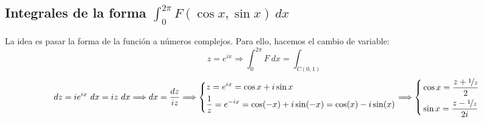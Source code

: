 \documentclass{report}
\begin{document}
      \subsection{Integrales de la  forma $\displaystyle \int_0^{2\pi}F(\cos x,\sin x)\ dx$}
        \noindent La idea es pasar la forma de la función a números complejos. Para ello, hacemos el cambio de variable:
        \[z=e^{ix}\Longrightarrow \int_0^{2\pi}F\ dx=\int_{C(0,1)}\]
        \[dz=ie^{ix}\ dx=iz\ dx\Longrightarrow dx=\dfrac{dz}{iz}\Longrightarrow
        \left\{\begin{aligned}
          &z=e^{ix}=\cos x+i\sin x\\
          &\dfrac{1}{z}=e^{-ix}=\cos (-x)+i\sin (-x)=\cos (x)-i\sin (x)
        \end{aligned}\right.\Longrightarrow 
        \left\{\begin{aligned}
          &\cos x=\dfrac{z+\nicefrac{1}{z}}{2}\\
          &\sin x=\dfrac{z-\nicefrac{1}{z}}{2i}
        \end{aligned}\right.\]
\end{document}
